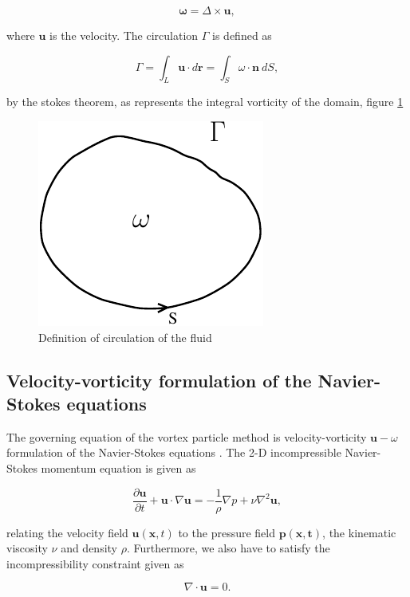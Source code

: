 	\begin{equation}
	\mathbf{\omega} = \Delta \times \mathbf{u},
	\end{equation}

where $\mathbf{u}$ is the velocity. The circulation $\Gamma$ is defined as

	\begin{equation}
	\Gamma = \int_L\mathbf{u}\cdot d \mathbf{r}=\int_S\omega\cdot\mathbf{n}\ dS,
	\label{eq:definitionOfCirculation}
	\end{equation}

by the stokes theorem, as represents the integral vorticity of the domain, figure \ref{fig:vorticityCirculation}

	\begin{figure}[t]
	\centering
	\includegraphics[width=0.3\linewidth]{./figures/lagrangian/vorticityCirculation.pdf}
	\caption{Definition of circulation of the fluid}
	\label{fig:vorticityCirculation}
	\end{figure}

 
\subsection{Velocity-vorticity formulation of the Navier-Stokes equations}
The governing equation of the vortex particle method is velocity-vorticity $\mathbf{u}-\omega$ formulation of the Navier-Stokes equations \cite{Cottet2000a}. The 2-D incompressible Navier-Stokes momentum equation is given as

	\begin{equation}
	\frac{\partial \mathbf{u}}{\partial t} + \mathbf{u}\cdot\nabla\mathbf{u} = - \frac{1}{\rho} \nabla p + \nu \nabla^2\mathbf{u},
	\label{eq:mom}
	\end{equation}

relating the velocity field $\mathbf{u}\left(\mathbf{x},t\right)$ to the pressure field $\mathbf{p\left(\mathbf{x},t\right)}$, the kinematic viscosity $\nu$ and density $\rho$. Furthermore, we also have to satisfy the incompressibility constraint given as

	\begin{equation}
	\nabla\cdot\mathbf{u} = 0.
	\end{equation}

